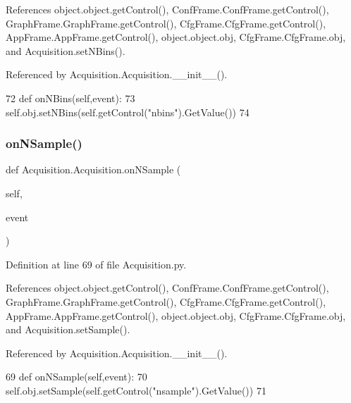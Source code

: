 References object.\+object.\+get\+Control(), Conf\+Frame.\+Conf\+Frame.\+get\+Control(), Graph\+Frame.\+Graph\+Frame.\+get\+Control(), Cfg\+Frame.\+Cfg\+Frame.\+get\+Control(), App\+Frame.\+App\+Frame.\+get\+Control(), object.\+object.\+obj, Cfg\+Frame.\+Cfg\+Frame.\+obj, and Acquisition.\+set\+N\+Bins().



Referenced by Acquisition.\+Acquisition.\+\_\+\+\_\+init\+\_\+\+\_\+().


\begin{DoxyCode}
72     \textcolor{keyword}{def }onNBins(self,event):
73         self.obj.setNBins(self.getControl(\textcolor{stringliteral}{"nbins"}).GetValue())  
74 
\end{DoxyCode}
\mbox{\label{classAcquisition_1_1Acquisition_ae0cfd44965bc1dd829cd6d6660cdd0ee}} 
\subsubsection{\texorpdfstring{on\+N\+Sample()}{onNSample()}}
{\footnotesize\ttfamily def Acquisition.\+Acquisition.\+on\+N\+Sample (\begin{DoxyParamCaption}\item[{}]{self,  }\item[{}]{event }\end{DoxyParamCaption})}



Definition at line 69 of file Acquisition.\+py.



References object.\+object.\+get\+Control(), Conf\+Frame.\+Conf\+Frame.\+get\+Control(), Graph\+Frame.\+Graph\+Frame.\+get\+Control(), Cfg\+Frame.\+Cfg\+Frame.\+get\+Control(), App\+Frame.\+App\+Frame.\+get\+Control(), object.\+object.\+obj, Cfg\+Frame.\+Cfg\+Frame.\+obj, and Acquisition.\+set\+Sample().



Referenced by Acquisition.\+Acquisition.\+\_\+\+\_\+init\+\_\+\+\_\+().


\begin{DoxyCode}
69     \textcolor{keyword}{def }onNSample(self,event):
70         self.obj.setSample(self.getControl(\textcolor{stringliteral}{"nsample"}).GetValue()) 
71 
\end{DoxyCode}
\mbox{\label{classAcquisition_1_1Acquisition_a37caf6d3a03c683c5fbcc079a2d8c7ec}} 
